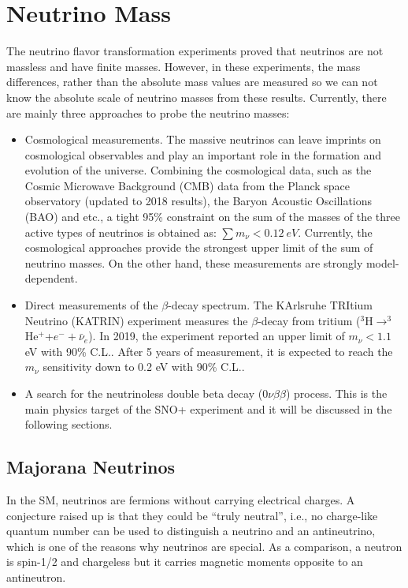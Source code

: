 \section{Neutrino Mass}\label{section:directMeasure}
The neutrino flavor transformation experiments proved that neutrinos are not massless and have finite masses. However, in these experiments, the mass differences, rather than the absolute mass values are measured so we can not know the absolute scale of neutrino masses from these results. Currently, there are mainly three approaches to probe the neutrino masses\cite{valle2015neutrinos}:
\begin{itemize}
	\item Cosmological measurements. The massive neutrinos can leave imprints on cosmological observables and play an important role in the formation and evolution of the universe. Combining the cosmological data, such as the Cosmic Microwave Background (CMB) data from the Planck space observatory (updated to 2018 results), the Baryon Acoustic Oscillations (BAO) and etc., a tight 95\% constraint on the sum of the masses of the three active types of neutrinos is obtained as: $\sum m_\nu<0.12~eV$\cite{aghanim2020planck}. Currently, the cosmological approaches provide the strongest upper limit of the sum of neutrino masses\cite{dvorkin2019neutrino}. On the other hand, these measurements are strongly model-dependent\cite{lesgourgues2013neutrino}.
	\item Direct measurements of the $\beta$-decay spectrum.
	 The KArlsruhe TRItium Neutrino (KATRIN) experiment measures the $\beta$-decay from tritium ($^3$H$\to^3$He$^+$+$e^-+\bar{\nu}_e$). In 2019, the experiment reported an upper limit of $m_\nu<1.1$ eV with 90\% C.L.. After 5 years of measurement, it is expected to reach the $m_\nu$ sensitivity down to 0.2 eV with 90\% C.L.\cite{aker2019improved}.
	 
	\item A search for the neutrinoless double beta decay ($0\nu\beta\beta$) process. This is the main physics target of the SNO+ experiment and it will be discussed in the following sections.
\end{itemize}

\subsection{Majorana Neutrinos}
In the SM, neutrinos are fermions without carrying electrical charges. A conjecture raised up is that they could be ``truly neutral'', i.e., no charge-like quantum number can be used to distinguish a neutrino and an antineutrino, which is one of the reasons why neutrinos are special. As a comparison, a neutron is spin-1/2 and chargeless but it carries magnetic moments opposite to an antineutron\cite{akhmedov2014majorana}.

